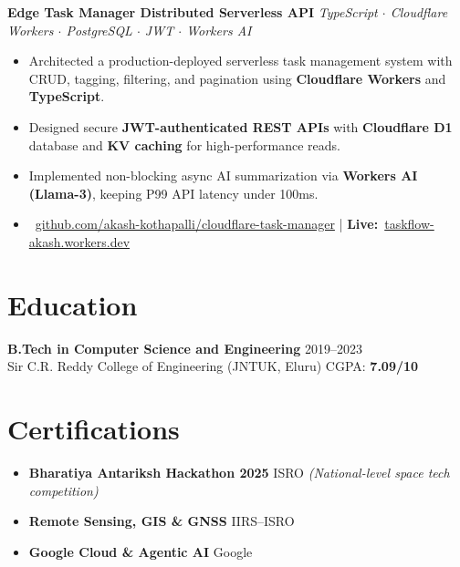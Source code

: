 \documentclass[a4paper,10pt]{article}
\newcommand{\iconbadge}[1]{%
  \tikz[baseline=-0.55ex]{\node[circle,fill=myblue,text=white,font=\bfseries\fontsize{5}{5}\selectfont,inner sep=1.3pt,minimum size=10pt]{#1};}%
}
\newcommand{\projectHeading}[2]{
  \vspace{0.08cm}\noindent\textbf{#1} \hfill \textit{#2}\par\vspace{0.03cm}
}
\begin{document}
\projectHeading{Edge Task Manager \textemdash{} Distributed Serverless API}{TypeScript $\cdot$ Cloudflare Workers $\cdot$ PostgreSQL $\cdot$ JWT $\cdot$ Workers AI}
\begin{itemize}
\item Architected a production-deployed serverless task management system with CRUD, tagging, filtering, and pagination using \textbf{Cloudflare Workers} and \textbf{TypeScript}.
\item Designed secure \textbf{JWT-authenticated REST APIs} with \textbf{Cloudflare D1} database and \textbf{KV caching} for high-performance reads.
\item Implemented non-blocking async AI summarization via \textbf{Workers AI (Llama-3)}, keeping P99 API latency under 100ms.
\item \iconbadge{gh}~\href{https://github.com/akash-kothapalli/cloudflare-task-manager}{github.com/akash-kothapalli/cloudflare-task-manager}
  \enspace\textcolor{myblue}{|}\enspace
  \textbf{Live:}~\href{https://cloudflare-task-manager.taskflow-akash.workers.dev}{taskflow-akash.workers.dev}
\end{itemize}

\section*{Education}
\textbf{B.Tech in Computer Science and Engineering} \hfill 2019--2023\\
Sir C.R. Reddy College of Engineering (JNTUK, Eluru) \hfill CGPA: \textbf{7.09/10}

\section*{Certifications}
\begin{itemize}
\item \textbf{Bharatiya Antariksh Hackathon 2025} \textemdash{} ISRO \textit{(National-level space tech competition)}
\item \textbf{Remote Sensing, GIS \& GNSS} \textemdash{} IIRS--ISRO
\item \textbf{Google Cloud \& Agentic AI} \textemdash{} Google
\end{itemize}
\end{document}
